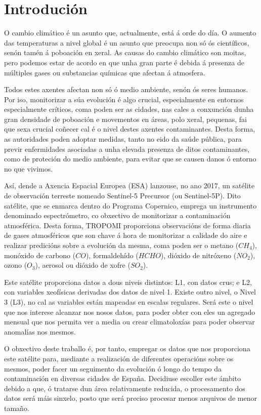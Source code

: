 \chapter{Introdución}\label{introducion}

O cambio climático é un asunto que, actualmente, está á orde do día. O aumento das temperaturas a nivel global é un asunto que preocupa non só ós
científicos, senón tamén á poboación en xeral. As causas do cambio climático son moitas, pero podemos estar de acordo en que unha gran parte é
debida á presenza de múltiples gases ou substancias químicas que afectan á atmosfera.

Todos estes axentes afectan non só ó medio ambiente, senón ós seres humanos. Por iso, monitorizar a súa evolución é algo crucial, especialmente en
entornos especialmente críticos, coma poden ser as cidades, nas cales a conxunción dunha gran densidade de poboación e movementos en áreas, polo xeral,
pequenas, fai que sexa crucial coñecer cal é o nivel destes axentes contaminantes. Desta forma, as autoridades poden adoptar medidas, tanto no eido
da saúde pública, para previr enfermidades asociadas a unha elevada presenza de ditos contaminantes, como de proteción do medio ambiente, para evitar
que se causen danos ó entorno no que vivimos.

Así, dende a Axencia Espacial Europea (ESA) lanzouse, no ano 2017, un satélite de observación terreste nomeado Sentinel-5 Precursor (ou Sentinel-5P).
Dito satélite, que se enmarca dentro do Programa Copernico, emprega un instrumento denominado espectrómetro, co obxectivo de monitorizar a contaminación
atmosférica. Desta forma, TROPOMI proporciona observacións de forma diaria de gases atmosféricos que son chave á hora de monitorizar a calidade do aire
e realizar predicións sobre a evolución da mesma, coma poden ser o metano ($CH_{4}$), monóxido de carbono ($CO$), formaldehído ($HCHO$), dióxido de nitróxeno
($NO_{2}$), ozono ($O_{3}$), aerosol ou dióxido de xofre ($SO_{2}$).

Este satélite proporciona datos a dous niveis distintos: L1, con datos crus; e L2, con variables xeofísicas derivadas dos datos de nivel 1. Existe outro nivel,
o Nivel 3 (L3), no cal as variables están mapeadas en escalas regulares. Será este o nivel que nos interese alcanzar nos nosos datos, para poder obter con eles
un agregado mensual que nos permita ver a media ou crear climatoloxías para poder observar anomalías nos mesmos.

O obxectivo deste traballo é, por tanto, empregar os datos que nos proporciona este satélite para, mediante a realización de diferentes operacións sobre
os mesmos, poder facer un seguimento da evolución ó longo do tempo da contaminación en diversas cidades de España. Decidiuse escoller este ámbito debido
a que, ó tratarse dun área relativamente reducida, o procesamento dos datos será máis sinxelo, posto que será preciso procesar menos arquivos de menor tamaño.


